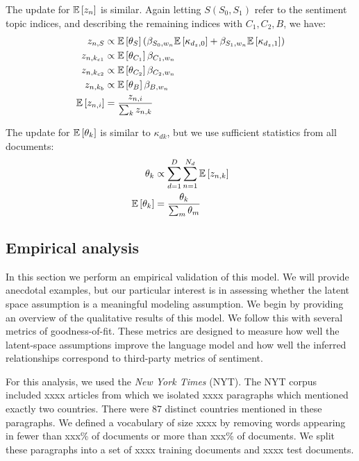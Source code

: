 The update for $\mathbb{E}\left[z_{n}\right]$ is similar.  Again letting $S (S_0,
S_1)$ refer to the sentiment topic indices, and describing the
remaining indices with $C_1, C_2, B$, we have:
\begin{align}
  z_{n,S} & \propto \mathbb{E}\left[\theta_{S}\right] \left( \beta_{S_0,w_n} \mathbb{E}\left[\kappa_{d_z, 0}\right] + \beta_{S_1,w_n} \mathbb{E}\left[\kappa_{d_z, 1}\right] \right) \nonumber \\
  z_{n,k_{c1}} & \propto \mathbb{E}\left[\theta_{C_1}\right] \beta_{C_1,w_n}  \nonumber \\
  z_{n,k_{c2}} & \propto \mathbb{E}\left[\theta_{C_2}\right] \beta_{C_2,w_n} \nonumber \\
  z_{n,k_{b}} & \propto \mathbb{E}\left[\theta_{B}\right] \beta_{B,w_n} \nonumber \\
  \mathbb{E}\left[z_{n,i}\right] & = \frac{ z_{n,i}} { \sum_k z_{n,k} } \label{equation:fr_e_z}
\end{align}

The update for $\mathbb{E}\left[\theta_k\right]$ is similar to $\kappa_{dk}$, but we use sufficient statistics from all documents:
\begin{align}
  \theta_{k} & \propto \sum_{d=1}^D \sum_{n=1}^{N_d} \mathbb{E}\left[z_{n,k}\right] \nonumber \\
  \mathbb{E}\left[\theta_{k}\right] & = \frac{\theta_{k}} { \sum_m \theta_{m} } \nonumber \\
\end{align}

\subsection*{Empirical analysis}

In this section we perform an empirical validation of this model.  We
will provide anecdotal examples, but our particular interest is in
assessing whether the latent space assumption is a meaningful modeling
assumption.  We begin by providing an overview of the qualitative
results of this model.  We follow this with several metrics of
goodness-of-fit.  These metrics are designed to measure how well the
latent-space assumptions improve the language model and how well the
inferred relationships correspond to third-party metrics of sentiment.

For this analysis, we used the \emph{New York Times}
(NYT).  The NYT corpus included xxxx articles
from which we isolated xxxx paragraphs which mentioned exactly two
countries. There were 87 distinct countries mentioned in these
paragraphs.  We defined a vocabulary of size xxxx by removing words
appearing in fewer than xxx\% of documents or more than xxx\% of
documents.  We split these paragraphs into a set of xxxx training
documents and xxxx test documents.

